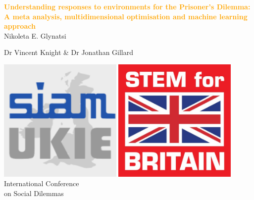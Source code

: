 \documentclass{beamer}
\begin{document}
\begin{frame}
    \begin{center}
        \large{\textbf{\textcolor{orange}{Understanding responses to environments for the Prisoner's Dilemma:
		A meta analysis, multidimensional optimisation and machine learning approach}}} \\

        \vspace{1cm}
        \normalsize{Nikoleta E. Glynatsi}

        \vspace{1cm}
        \footnotesize{Dr Vincent Knight \& Dr Jonathan Gillard}

    \end{center}
\end{frame}

\begin{frame}
    \begin{center}
    \begin{minipage}{.45\textwidth}
        \includegraphics[width=0.45\textwidth]{static/ukie.png}
        \includegraphics[width=0.45\textwidth]{static/stem.jpg} \vspace{.5cm} \\
        \centering
        International Conference \\ on Social Dilemmas
    \end{minipage} \hfill \pause

\end{center}
\end{frame}
\end{document}
